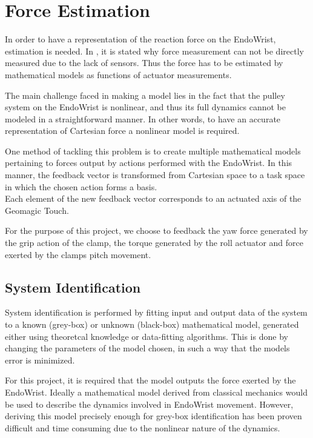 \chapter{Force Estimation} \label{ch:fem}
In order to have a representation of the reaction force on the EndoWrist, estimation is needed. 
In , it is stated why force measurement can not be directly measured due to the lack of sensors. Thus the force has to be estimated by mathematical models as functions of actuator measurements.

The main challenge faced in making a model lies in the fact that the pulley system on the EndoWrist is nonlinear, and thus its full dynamics cannot be modeled in a straightforward manner. 
In other words, to have an accurate representation of Cartesian force a  nonlinear model is required.

One method of tackling this problem is to create multiple mathematical models pertaining to forces output by actions performed with the EndoWrist.
In this manner, the feedback vector is transformed from Cartesian space to a task space in which the chosen action forms a basis.\\
Each element of the new feedback vector corresponds to an actuated axis of the Geomagic Touch.

For the purpose of this project, we choose to feedback the yaw force generated by the grip action of the clamp, the torque generated by the roll actuator and force exerted by the clamps pitch movement.

\section{System Identification}
System identification is performed by fitting input and output data of the system to a known (grey-box) or unknown (black-box) mathematical model, generated either using theoretcal knowledge or data-fitting algorithms. 
This is done by changing the parameters of the model chosen, in such a way that the models error is minimized. 

For this project, it is required that the model outputs the force exerted by the EndoWrist.
Ideally a mathematical model derived from classical mechanics would be used to describe the dynamics involved in EndoWrist movement.
However, deriving this model precisely enough for grey-box identification has been proven difficult and time consuming due to the nonlinear nature of the dynamics\cite{kim2014dynamic}.

